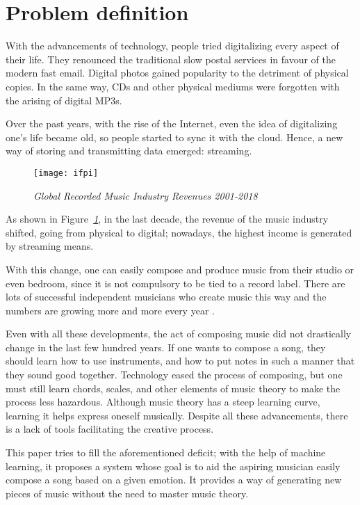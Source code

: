 \section{Problem definition}
With the advancements of technology,
people tried digitalizing every aspect of their life.
They renounced the traditional slow postal services in favour of
the modern fast email.
Digital photos gained popularity to the detriment of physical copies.
In the same way, CDs and other physical mediums were
forgotten with the arising of digital MP3s.


Over the past years, with the rise of the Internet,
even the idea of digitalizing one's life became old,
so people started to sync it with the cloud.
Hence, a new way of storing and transmitting data emerged: streaming.

\begin{figure}[h]
  \centering
  \texttt{[image: ifpi]}
  \caption{\emph{Global Recorded Music Industry Revenues 2001-2018  \cite{ifpi}}}
  \label{fig:ifpi}
\end{figure}

As shown in Figure\emph{~\ref{fig:ifpi}}, in the last decade,
the revenue of the music industry shifted,
going from physical to digital; nowadays,
the highest income is generated by streaming means.

With this change, one can easily compose and produce
music from their studio or even bedroom,
since it is not compulsory to be tied to a record label.
There are lots of successful independent musicians who
create music this way and the numbers are growing more
and more every year \cite{forbes}.

Even with all these developments,
the act of composing music did not drastically change in the last
few hundred years. If one wants to compose a song,
they should learn how to use instruments,
and how to put notes in such a manner that they sound good together.
Technology eased the process of composing,
but one must still learn chords, scales,
and other elements of music theory to make the process less hazardous.
Although music theory has a steep learning curve,
learning it helps express oneself musically.
Despite all these advancements,
there is a lack of tools facilitating the creative process.

This paper tries to fill the aforementioned deficit;
with the help of machine learning,
it proposes a system whose goal is to aid the aspiring musician easily
compose a song based on a given emotion.
It provides a way of generating new pieces of music without the need to master music theory.


